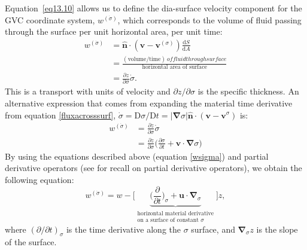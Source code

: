 Equation~\eqref{eq13.10} allows us to define the dia-surface velocity component for the GVC coordinate system, $w^{(\dot{\sigma})}$, which corresponds to the volume of fluid passing through the surface per unit horizontal area, per unit time:
\begin{equation}
\begin{aligned}
w^{(\dot{\sigma})} & = \hat{\boldsymbol{n}} \cdot (\boldsymbol{v}-\boldsymbol{v}^{(\sigma)}) \frac{\mathrm{d}S}{\mathrm{d}A} \\
& = \frac{(\text{volume}/\text{time}) \: of fluid through surface}{\text{horizontal area of surface}} \\
& = \frac{\partial z}{\partial \sigma} \dot{\sigma}.
\end{aligned}
\label{VelComp1}
\end{equation}
This is a transport with units of velocity and $\partial z/\partial \sigma$ is the specific thickness. An alternative expression that comes from expanding the material time derivative from equation \eqref{fluxacrosssurf}, $\dot{\sigma} = \mathrm{D}\sigma/\mathrm{D}t = |\boldsymbol{\nabla} \sigma| \boldsymbol{\hat{n}} \cdot (\boldsymbol{v} - \boldsymbol{v}^\sigma)$ is:
\begin{align}
w^{(\dot{\sigma})} & =\frac{\partial z}{\partial \sigma} \dot{\sigma} \nonumber\\
& = \frac{\partial z}{\partial \sigma} \bigg (\frac{\partial \sigma}{\partial t} + \boldsymbol{v} \cdot \boldsymbol{\nabla} \sigma \bigg )
\label{wsigma}
\end{align}
By using the equations described above (equation \ref{wsigma}) and partial derivative operators (see \citet[Chapter 18.3 and 8.2 in][]{Griffies2019} for recall on partial derivative operators), we obtain the following equation:
\begin{equation}
w^{(\dot{\sigma})} = w - \bigg [\!\!\!\!\!\underbrace{\bigg (\frac{\partial}{\partial t}\bigg )_\sigma + \boldsymbol{u} \cdot \boldsymbol{\nabla}_\sigma}_{\substack{\text{horizontal material derivative}\\\text{on a surface of constant $\sigma$}}} \!\!\!\!\!\bigg ]z,
\label{VelComp}
\end{equation}
where $(\partial/\partial t)_\sigma$ is the time derivative along the $\sigma$ surface, and $\boldsymbol{\nabla}_\sigma z$ is the slope of the surface.

